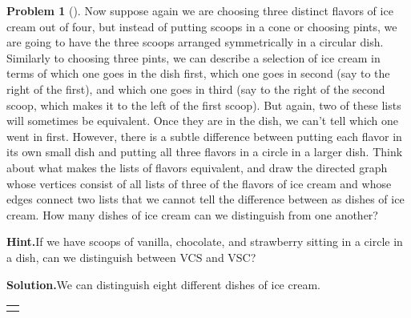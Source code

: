 \documentclass[10pt,]{book}
\theoremstyle{plain}
\theoremstyle{definition}
\newtheorem{activity}[project]{Problem}
\theoremstyle{definition}
\numberwithin{equation}{chapter}
\newlength{\panelmax}
\begin{document}
\begin{activity}[]\label{icecreaminadish}
Now suppose again we are choosing three distinct flavors of ice cream out of four, but instead of putting scoops in a cone or choosing pints, we are going to have the three scoops arranged symmetrically in a circular dish. Similarly to choosing three pints, we can describe a selection of ice cream in terms of which one goes in the dish first, which one goes in second (say to the right of the first), and which one goes in third (say to the right of the second scoop, which makes it to the left of the first scoop). But again, two of these lists will sometimes be equivalent. Once they are in the dish, we can't tell which one went in first. However, there is a subtle difference between putting each flavor in its own small dish and putting all three flavors in a circle in a larger dish. Think about what makes the lists of flavors equivalent, and draw the directed graph whose vertices consist of all lists of three of the flavors of ice cream and whose edges connect two lists that we cannot tell the difference between as dishes of ice cream. How many dishes of ice cream can we distinguish from one another?%
\par\medskip\noindent%
\textbf{Hint.}\quad If we have scoops of vanilla, chocolate, and strawberry sitting in a circle in a dish, can we distinguish between VCS and VSC?%
\par\medskip\noindent%
\textbf{Solution.}\quad We can distinguish eight different dishes of ice cream.%
{%
\setlength{\panelmax}{0pt}
\newsavebox{\panelboxBAimage}
\newlength{\phBAimage}\setlength{\phBAimage}{\ht\panelboxBAimage+\dp\panelboxBAimage}
\settototalheight{\phBAimage}{\usebox{\panelboxBAimage}}
\setlength{\panelmax}{\maxof{\panelmax}{\phBAimage}}
\leavevmode%
\setlength{\tabcolsep}{0\linewidth}
\par\medskip\noindent
\hspace*{0.15\linewidth}%
\begin{tabular}{@{}*{1}{c}@{}}
\begin{minipage}[c][\panelmax][t]{0.7\linewidth}\usebox{\panelboxBAimage}\end{minipage}\end{tabular}\\
}%
\end{activity}
\end{document}
